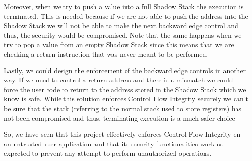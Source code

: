 Moreover, when we try to push a value into a full Shadow Stack the execution is
terminated. This is needed because if we are not able to push the address into the
Shadow Stack we will not be able to make the next backward edge control and thus,
the security would be compromised. Note that the same happens when we try to pop
a value from an empty Shadow Stack since this means that we are checking a return
instruction that was never meant to be performed.

Lastly, we could design the enforcement of the backward edge controls in another
way. If we need to control a return address and there is a mismatch we could force
the user code to return to the address stored in the Shadow Stack which we know is
safe. While this solution enforces Control Flow Integrity securely we can't be
sure that the stack (referring to the normal stack used to store registers) has
not been compromised and thus, terminating execution is a much safer choice.

So, we have seen that this project effectively enforces Control Flow Integrity
on an untrusted user application and that its security functionalities work as
expected to prevent any attempt to perform unauthorized operations.
